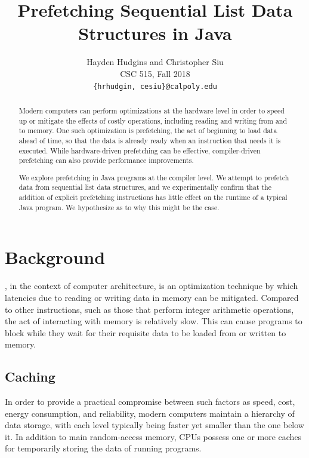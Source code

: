 \documentclass[journal]{IEEEtran}
\begin{document}
\title{Prefetching Sequential List Data Structures in Java}
\author{Hayden Hudgins and Christopher Siu \\
        CSC 515, Fall 2018\\
        \texttt{\{hrhudgin, cesiu\}@calpoly.edu}}

\maketitle


\begin{abstract}
    Modern computers can perform optimizations at the hardware level in order to speed up or mitigate the effects of costly operations, including reading and writing from and to memory. One such optimization is prefetching, the act of beginning to load data ahead of time, so that the data is already ready when an instruction that needs it is executed. While hardware-driven prefetching can be effective, compiler-driven prefetching can also provide performance improvements.

    We explore prefetching in Java programs at the compiler level. We attempt to prefetch data from sequential list data structures, and we experimentally confirm that the addition of explicit prefetching instructions has little effect on the runtime of a typical Java program. We hypothesize as to why this might be the case.
\end{abstract}


\section{Background}

, in the context of computer architecture, is an optimization technique by which latencies due to reading or writing data in memory can be mitigated. Compared to other instructions, such as those that perform integer arithmetic operations, the act of interacting with memory is relatively slow. This can cause programs to block while they wait for their requisite data to be loaded from or written to memory.

\subsection{Caching}

In order to provide a practical compromise between such factors as speed, cost, energy consumption, and reliability, modern computers maintain a hierarchy of data storage, with each level typically being faster yet smaller than the one below it. In addition to main random-access memory, CPUs possess one or more caches for temporarily storing the data of running programs.
\end{document}
